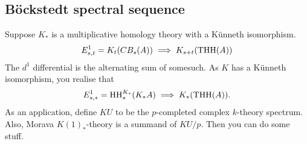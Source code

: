 \begin{GeoffroyTopologicalHochschildHomology}
\subsection*{B\"ockstedt spectral sequence}
Suppose $K_*$ is a multiplicative homology theory with a K\"unneth isomorphism.
\[E^1_{s,t}=K_t(CB_s(A))\implies K_{s+t}(\textup{THH}(A))\]
The $d^1$ differential is the alternating sum of somesuch. As $K$ has a K\"unneth isomorphism, you realise that
\[E^1_{s,*}=\textup{HH}^{K_*}_s(K_*A)\implies K_*(\textup{THH}(A)).\]
As an application, define $KU$ to be the $p$-completed complex $k$-theory spectrum. Also, Morava $K(1)_*$-theory is a summand of $KU/p$. Then you can do some stuff.













\pagebreak
\end{GeoffroyTopologicalHochschildHomology}
